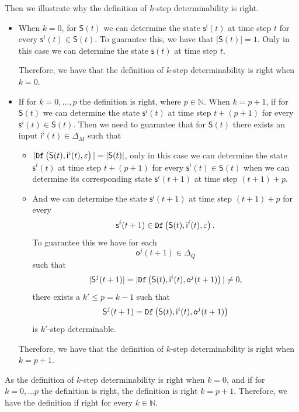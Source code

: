 Then we illustrate why the definition of $k$-step determinability is right.
\begin{itemize}
\item When $k=0$, for $\mathsf{S}(t)$ we can determine the state $\mathsf{s^{i}}(t)$ at time step $t$ for every $\mathsf{s}^{i}(t)\in \mathsf{S}(t)$. To guarantee this, we have that $|\mathsf{S}(t)|=1$. Only in this case we can determine the state $\mathsf{s}(t)$ at time step $t$. 

Therefore, we have that the definition of $k$-step determinability is right when $k=0$.

\item  If for $k=0,\ldots, p$ the definition is right, where $p\in\mathbb{N}$. When $k=p+1$, if for $\mathsf{S}(t)$ we can determine the state $\mathsf{s}^{i}(t)$ at time step $t+(p+1)$ for every $\mathsf{s}^{i}(t)\in \mathsf{S}(t)$. Then we need to guarantee that for $\mathsf{S}(t)$ there exists an input $\mathsf{i}^{i}(t) \in \Delta_M$ such that
\begin{itemize}
\item $|{\tt Df}\left(\mathsf{S}(t),\mathsf{i}^{i}(t),\varepsilon\right)|=|\mathsf{S}(t)|$, only in this case we can determine the state $\mathsf{s}^{i}(t)$ at time step $t+(p+1)$ for every $\mathsf{s}^{i}(t)\in \mathsf{S}(t)$ when we can determine its corresponding state $\mathsf{s}^{i}(t+1)$ at time step $(t+1)+p$.
\item And we can determine the state $\mathsf{s^{i}}(t+1)$ at time step $(t+1)+p$ for every \[\mathsf{s}^{i}(t+1)\in {\tt Df}\left(\mathsf{S}(t),\mathsf{i}^{i}(t),\varepsilon\right).\] To guarantee this we have for each \[\mathsf{o}^{j}(t+1)\in \Delta_Q\] such that \[|\mathsf{S}^{j}(t+1)|=|{\tt Df}\left(\mathsf{S}(t),\mathsf{i}^{i}(t),\mathsf{o}^{j}(t+1)\right)|\neq 0,\] there exists a ${k'}\le p=k-1$ such that \[\mathsf{S}^{j}(t+1)={\tt Df}\left(\mathsf{S}(t),\mathsf{i}^{i}(t),\mathsf{o}^{j}(t+1)\right)\] is $k'$-step determinable. 
 \end{itemize}
Therefore, we have that the definition of $k$-step determinability is right when $k=p+1$.

 \end{itemize}
 
As the definition of $k$-step determinability is right when $k=0$, and if for $k=0,\ldots p$ the definition is right, the definition is right  $k=p+1$. Therefore, we have the definition if right for every $k\in \mathbb{N}$.
 
